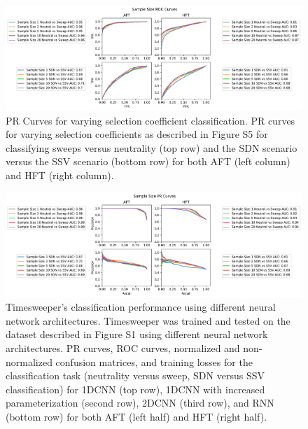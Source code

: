 \begin{figure}
    \centering
    \includegraphics[width=\textwidth]{figures/ap1/S16_Samp_Size_ROC.pdf}
    \caption[PR Curves for varying selection coefficient classification.]{PR Curves for varying selection coefficient classification. PR curves for varying selection coefficients as described in Figure S5 for classifying sweeps versus neutrality (top row) and the SDN scenario versus the SSV scenario (bottom row) for both AFT (left column) and HFT (right column).}
    \label{fig:S16_Samp_Size_ROC}
\end{figure}

\begin{figure}
    \centering
    \includegraphics[width=\textwidth]{figures/ap1/S17_Samp_Size_PR.pdf}
    \caption[Timesweeper’s classification performance using different neural network architectures.]{Timesweeper’s classification performance using different neural network architectures. Timesweeper was trained and tested on the dataset described in Figure S1 using different neural network architectures. PR curves, ROC curves, normalized and non-normalized confusion matrices, and training losses for the classification task (neutrality versus sweep, SDN versus SSV classification) for 1DCNN (top row), 1DCNN with increased parameterization (second row), 2DCNN (third row), and RNN (bottom row) for both AFT (left half) and HFT (right half). }
    \label{fig:S17_Samp_Size_PR}
\end{figure}

